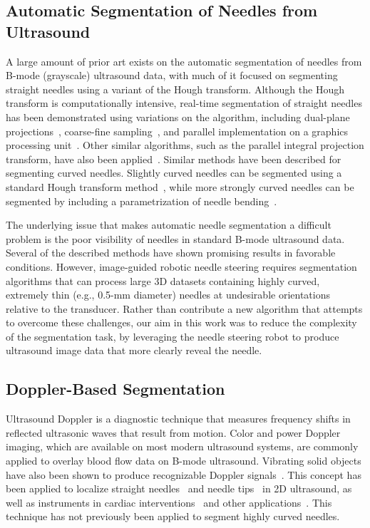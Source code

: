 \subsection{Automatic Segmentation of Needles from Ultrasound}
A large amount of prior art exists on the automatic segmentation of needles from B-mode (grayscale) ultrasound data, with much of it focused on segmenting straight needles using a variant of the Hough transform. Although the Hough transform is computationally intensive, real-time segmentation of straight needles has been demonstrated using variations on the algorithm, including dual-plane projections~\cite{Ding2003b}, coarse-fine sampling~\cite{Ding2003a,Zhou2008}, and parallel implementation on a graphics processing unit~\cite{Novotny2007}. Other similar algorithms, such as the parallel integral projection transform, have also been applied~\cite{Barva2008}. Similar methods have been described for segmenting curved needles. Slightly curved needles can be segmented using a standard Hough transform method~\cite{Okazawa2006,Aboofazeli2009}, while more strongly curved needles can be segmented by including a parametrization of needle bending~\cite{Neshat2008,Okazawa2006,Uhercik2010}.

The underlying issue that makes automatic needle segmentation a difficult problem is the poor visibility of needles in standard B-mode ultrasound data. Several of the described methods have shown promising results in favorable conditions. However, image-guided robotic needle steering requires segmentation algorithms that can process large 3D datasets containing highly curved, extremely thin (e.g., 0.5-mm diameter) needles at undesirable orientations relative to the transducer. Rather than contribute a new algorithm that attempts to overcome these challenges, our aim in this work was to reduce the complexity of the segmentation task, by leveraging the needle steering robot to produce ultrasound image data that more clearly reveal the needle.

\subsection{Doppler-Based Segmentation}
Ultrasound Doppler is a diagnostic technique that measures frequency shifts in reflected ultrasonic waves that result from motion. Color and power Doppler imaging, which are available on most modern ultrasound systems, are commonly applied to overlay blood flow data on B-mode ultrasound. Vibrating solid objects have also been shown to produce recognizable Doppler signals~\cite{Holen1985}. This concept has been applied to localize straight needles~\cite{Armstrong2001,Feld1997,Hamper1991} and needle tips~\cite{Harmat2006} in 2D ultrasound, as well as instruments in cardiac interventions~\cite{Fronheiser2008,Reddy2008} and other applications~\cite{McAleavey2003,Rogers2009}. This technique has not previously been applied to segment highly curved needles.

